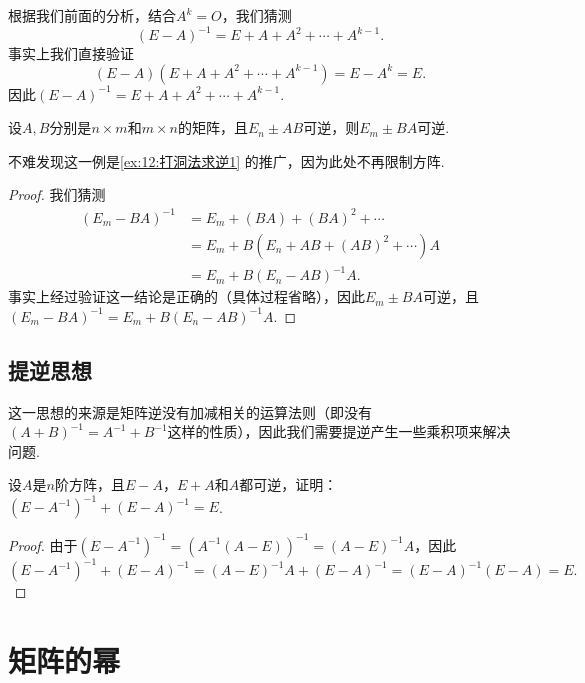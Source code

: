 \begin{solution}
    根据我们前面的分析，结合$A^k=O$，我们猜测
    \[(E-A)^{-1}=E+A+A^2+\cdots+A^{k-1}.\]
    事实上我们直接验证
    \[(E-A)(E+A+A^2+\cdots+A^{k-1})=E-A^k=E.\]
    因此$(E-A)^{-1}=E+A+A^2+\cdots+A^{k-1}$.
\end{solution}

\begin{example}
    设$A,B$分别是$n \times m$和$m \times n$的矩阵，且$E_n \pm AB$可逆，则$E_m \pm BA$可逆.
\end{example}
不难发现这一例是\autoref{ex:12:打洞法求逆1} 的推广，因为此处不再限制方阵.

\begin{proof}
    我们猜测
    \begin{align*}
        (E_m-BA)^{-1}&=E_m+(BA)+(BA)^2+\cdots \\
        &=E_m+B(E_n+AB+(AB)^2+\cdots)A \\
        &=E_m+B(E_n-AB)^{-1}A.
    \end{align*}
    事实上经过验证这一结论是正确的（具体过程省略），因此$E_m \pm BA$可逆，且$(E_m-BA)^{-1}=E_m+B(E_n-AB)^{-1}A$.
\end{proof}

\subsection{提逆思想}

这一思想的来源是矩阵逆没有加减相关的运算法则（即没有$(A+B)^{-1}=A^{-1}+B^{-1}$这样的性质），因此我们需要提逆产生一些乘积项来解决问题.
\begin{example}
    设$A$是$n$阶方阵，且$E-A$，$E+A$和$A$都可逆，证明：$(E-A^{-1})^{-1}+(E-A)^{-1}=E$.
\end{example}

\begin{proof}
    由于$(E-A^{-1})^{-1}=(A^{-1}(A-E))^{-1}=(A-E)^{-1}A$，因此
    \[(E-A^{-1})^{-1}+(E-A)^{-1}=(A-E)^{-1}A+(E-A)^{-1}=(E-A)^{-1}(E-A)=E.\]
\end{proof}

\section{矩阵的幂} \label{sec:12:矩阵的幂}

